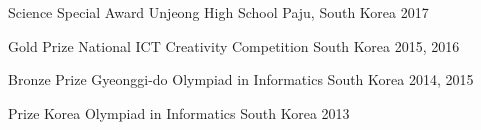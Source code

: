 

\begin{cvhonors}

  \cvhonor
    {Science Special Award} %
    {Unjeong High School} %
    {Paju, South Korea} %
    {2017} %

  \cvhonor
    {Gold Prize} %
    {National ICT Creativity Competition} %
    {South Korea} %
    {2015, 2016} %

  \cvhonor
    {Bronze Prize} %
    {Gyeonggi-do Olympiad in Informatics} %
    {South Korea} %
    {2014, 2015} %

  \cvhonor
    {Prize} %
    {Korea Olympiad in Informatics} %
    {South Korea} %
    {2013} %

\end{cvhonors}
